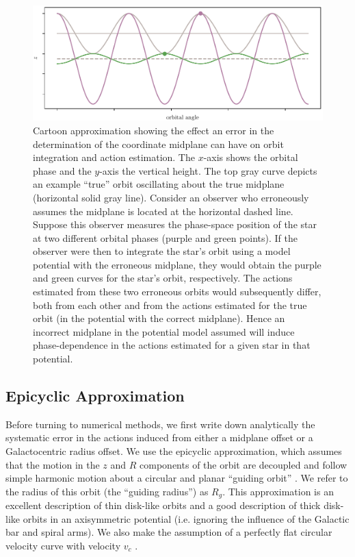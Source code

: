 \documentclass[twocolumn]{aastex62}
\begin{document}
\begin{figure}
\begin{center}
\includegraphics[width=\textwidth]{fig/cartoon.pdf}
\end{center}
\caption{Cartoon approximation showing the effect an error in the determination of the
coordinate midplane can have on orbit integration and action estimation. The
$x$-axis shows the orbital phase and the $y$-axis the vertical height. The top
gray curve depicts an example ``true'' orbit oscillating about the true
midplane (horizontal solid gray line). Consider an observer who erroneously
assumes the midplane is located at the horizontal dashed line. Suppose this
observer measures the phase-space position of the star at two different
orbital phases (purple and green points). If the observer were then to
integrate the star's orbit using a model potential with the erroneous
midplane, they would obtain the purple and green curves for the star's orbit,
respectively. The actions estimated from these two  erroneous orbits would
subsequently differ, both from each other and from the actions estimated for
the true orbit (in the potential with the correct midplane). Hence an
incorrect midplane in the potential model assumed will induce phase-dependence
in the actions estimated for a given star in that potential.}
\label{fig:cartoon}
\end{figure}

\subsection{Epicyclic Approximation} \label{ssec:epi_action}
Before turning to numerical methods, we first write down analytically the systematic error in the actions induced from either a midplane offset or a Galactocentric radius
offset. We use the epicyclic approximation, which assumes that the motion in
the $z$ and $R$ components of the orbit are decoupled and follow simple
harmonic motion about a circular and planar ``guiding orbit'' \citep[][Section 3.2 and references therein]{2008gady.book.....B}. We refer to the radius of this orbit (the ``guiding radius'') as $R_g$. This approximation is an excellent description of
thin disk-like orbits and a good description of thick disk-like orbits in an axisymmetric potential (i.e. ignoring the influence of the Galactic bar and spiral arms). We
also make the assumption of a perfectly flat circular velocity curve with
velocity $v_c$ \citep[decent near the Solar circle, e.g.][]{2017MNRAS.465...76M}. 
\end{document}
